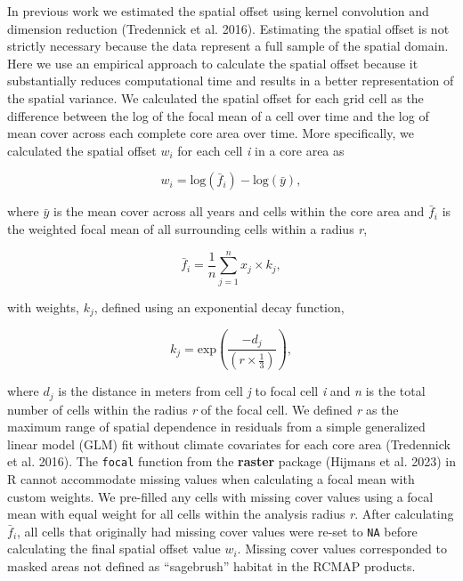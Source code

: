 \documentclass[
  12pt,
]{article}
\begin{document}
In previous work we estimated the spatial offset using kernel convolution and dimension reduction (Tredennick et al. 2016).
Estimating the spatial offset is not strictly necessary because the data represent a full sample of the spatial domain.
Here we use an empirical approach to calculate the spatial offset because it substantially reduces computational time and results in a better representation of the spatial variance.
We calculated the spatial offset for each grid cell as the difference between the log of the focal mean of a cell over time and the log of mean cover across each complete core area over time. More specifically, we calculated the spatial offset \(w_i\) for each cell \emph{i} in a core area as

\begin{equation}
w_{i} = {\text{log}(\bar{f}_{i}) - \text{log}(\bar{y})},
\end{equation}

\noindent{}where \(\bar{y}\) is the mean cover across all years and cells within the core area and \(\bar{f}_{i}\) is the weighted focal mean of all surrounding cells within a radius \emph{r},

\begin{equation}
\bar{f}_{i} = \frac{1}{n} \sum_{j=1}^{n}x_{j} \times k_{j},
\end{equation}

\noindent{}with weights, \(k_{j}\), defined using an exponential decay function,

\begin{equation}
k_{j} = \text{exp}\left( \frac{-d_{j} }{\left(r\times\frac{1}{3} \right)} \right),
\end{equation}

\noindent{}where \(d_j\) is the distance in meters from cell \emph{j} to focal cell \emph{i} and \emph{n} is the total number of cells within the radius \emph{r} of the focal cell.
We defined \emph{r} as the maximum range of spatial dependence in residuals from a simple generalized linear model (GLM) fit without climate covariates for each core area (Tredennick et al. 2016).
The \texttt{focal} function from the \textbf{raster} package (Hijmans et al. 2023) in R cannot accommodate missing values when calculating a focal mean with custom weights.
We pre-filled any cells with missing cover values using a focal mean with equal weight for all cells within the analysis radius \emph{r}.
After calculating \(\bar{f}_{i}\), all cells that originally had missing cover values were re-set to \texttt{NA} before calculating the final spatial offset value \(w_i\).
Missing cover values corresponded to masked areas not defined as ``sagebrush'' habitat in the RCMAP products.
\end{document}
